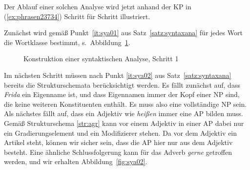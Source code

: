 
Der Ablauf einer solchen Analyse wird jetzt anhand der KP in (\ref{ex:phrasen23734}) Schritt für Schritt illustriert.

\begin{exe}
\end{exe}

Zunächst wird gemäß Punkt~\ref{it:sya01} aus Satz~\ref{satz:syntaxana} für jedes Wort die Wortklasse bestimmt, s.\ Abbildung~\ref{fig:sya01}.

\begin{figure}[!htbp]
  \caption{Konstruktion einer syntaktischen Analyse, Schritt 1}
  \label{fig:sya01}
\end{figure}

Im nächsten Schritt müssen nach Punkt \ref{it:sya02} aus Satz~\ref{satz:syntaxana} bereits die Strukturschemata berücksichtigt werden.
Es fällt zunächst auf, dass \textit{Frida} ein Eigenname ist, und dass Eigennamen immer der Kopf einer NP sind, die keine weiteren Konstituenten enthält.
Es muss also eine vollständige NP sein.
Als nächstes fällt auf, dass ein Adjektiv wie \textit{heißen} immer eine AP bilden muss.
Gemäß Strukturschema \ref{str:agr} kann vor einem Adjektiv in einer AP dabei nur ein Gradierungselement und ein Modifizierer stehen.
Da vor dem Adjektiv ein Artikel steht, können wir sicher sein, dass die AP hier nur aus dem Adjektiv besteht.
Eine ähnliche Schlussfolgerung kann für das Adverb \textit{gerne} getroffen werden, und wir erhalten Abbildung~\ref{fig:sya02}.

